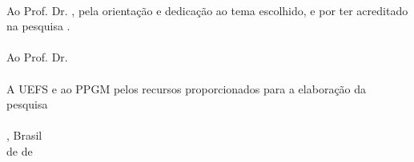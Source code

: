 
\begin{agradecimentos}

\ \\
Ao Prof. Dr. \theadvisor, pela orientação e dedicação ao tema escolhido, e por ter acreditado na pesquisa .\\
\\
Ao Prof. Dr. \thecoadvisor \\
\\
A UEFS e ao PPGM pelos recursos proporcionados para a elaboração da pesquisa\\
\\

\noindent
\ppgmcidade, Brasil \hfill \theauthor\\
\ppgmdia\space de \ppgmmes\space de \ppgmano
\end{agradecimentos}

